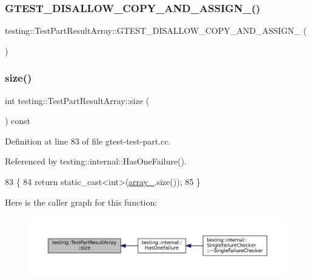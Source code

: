 \subsubsection{\texorpdfstring{G\+T\+E\+S\+T\+\_\+\+D\+I\+S\+A\+L\+L\+O\+W\+\_\+\+C\+O\+P\+Y\+\_\+\+A\+N\+D\+\_\+\+A\+S\+S\+I\+G\+N\+\_\+()}{GTEST\_DISALLOW\_COPY\_AND\_ASSIGN\_()}}
{\footnotesize\ttfamily testing\+::\+Test\+Part\+Result\+Array\+::\+G\+T\+E\+S\+T\+\_\+\+D\+I\+S\+A\+L\+L\+O\+W\+\_\+\+C\+O\+P\+Y\+\_\+\+A\+N\+D\+\_\+\+A\+S\+S\+I\+G\+N\+\_\+ (\begin{DoxyParamCaption}\item[{\hyperlink{classtesting_1_1TestPartResultArray}{Test\+Part\+Result\+Array}}]{ }\end{DoxyParamCaption})\hspace{0.3cm}{\ttfamily [private]}}

\mbox{\label{classtesting_1_1TestPartResultArray_a31555f11ba42b81ddad0a26a87710d0a}} 
\subsubsection{\texorpdfstring{size()}{size()}}
{\footnotesize\ttfamily int testing\+::\+Test\+Part\+Result\+Array\+::size (\begin{DoxyParamCaption}{ }\end{DoxyParamCaption}) const}



Definition at line 83 of file gtest-\/test-\/part.\+cc.



Referenced by testing\+::internal\+::\+Has\+One\+Failure().


\begin{DoxyCode}
83                                     \{
84   \textcolor{keywordflow}{return} \textcolor{keyword}{static\_cast<}\textcolor{keywordtype}{int}\textcolor{keyword}{>}(\hyperlink{classtesting_1_1TestPartResultArray_a288da4fd16773d079722d6824a63060f}{array\_}.size());
85 \}
\end{DoxyCode}
Here is the caller graph for this function\+:
\nopagebreak
\begin{figure}[H]
\begin{center}
\leavevmode
\includegraphics[width=350pt]{classtesting_1_1TestPartResultArray_a31555f11ba42b81ddad0a26a87710d0a_icgraph}
\end{center}
\end{figure}


